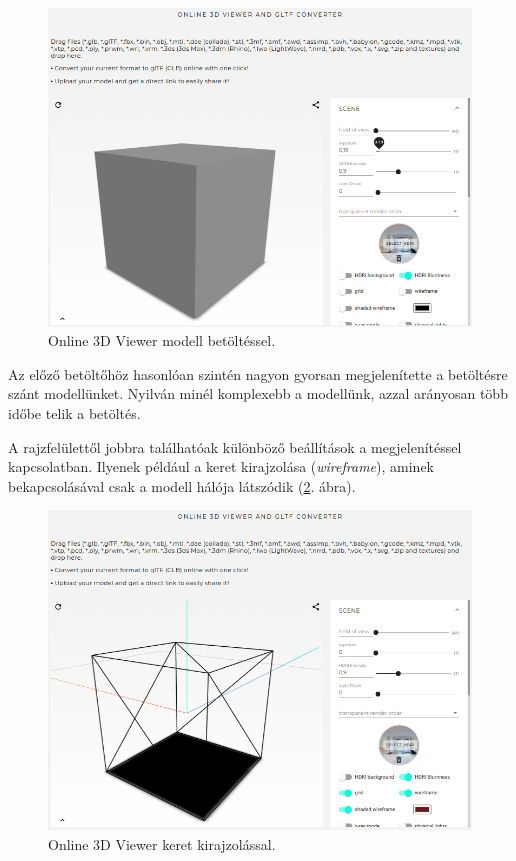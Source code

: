 \begin{figure}[h]
\centering
\includegraphics[width=\textwidth]{images/3D_creators_2.png}
\caption{Online 3D Viewer modell betöltéssel.}
\label{fig:3d2}
\end{figure}

Az előző betöltőhöz hasonlóan szintén nagyon gyorsan megjelenítette a betöltésre szánt modellünket. Nyilván minél komplexebb a modellünk, azzal arányosan több időbe telik a betöltés.

A rajzfelülettől jobbra találhatóak különböző beállítások a megjelenítéssel kapcsolatban. Ilyenek például a keret kirajzolása (\textit{wireframe}), aminek bekapcsolásával csak a modell hálója látszódik (\ref{fig:3d3}. ábra).

\begin{figure}[h]
\centering
\includegraphics[width=\textwidth]{images/3D_creators_4.png}
\caption{Online 3D Viewer keret kirajzolással.}
\label{fig:3d3}
\end{figure}

